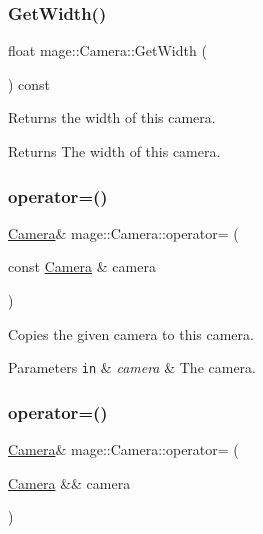 \hypertarget{classmage_1_1_camera_a2285655605035118861297b2449a3443}{}\label{classmage_1_1_camera_a2285655605035118861297b2449a3443} 
\subsubsection{\texorpdfstring{Get\+Width()}{GetWidth()}}
{\footnotesize\ttfamily float mage\+::\+Camera\+::\+Get\+Width (\begin{DoxyParamCaption}{ }\end{DoxyParamCaption}) const}

Returns the width of this camera.

\begin{DoxyReturn}{Returns}
The width of this camera. 
\end{DoxyReturn}
\hypertarget{classmage_1_1_camera_ae16a5f66b80f7fa771475aa1eb099634}{}\label{classmage_1_1_camera_ae16a5f66b80f7fa771475aa1eb099634} 
\subsubsection{\texorpdfstring{operator=()}{operator=()}\hspace{0.1cm}{\footnotesize\ttfamily [1/2]}}
{\footnotesize\ttfamily \hyperlink{classmage_1_1_camera}{Camera}\& mage\+::\+Camera\+::operator= (\begin{DoxyParamCaption}\item[{const \hyperlink{classmage_1_1_camera}{Camera} \&}]{camera }\end{DoxyParamCaption})}

Copies the given camera to this camera.


\begin{DoxyParams}[1]{Parameters}
\mbox{\tt in}  & {\em camera} & The camera. \\
\hline
\end{DoxyParams}
\hypertarget{classmage_1_1_camera_aab826877e458127dadfb7ed54f9336a9}{}\label{classmage_1_1_camera_aab826877e458127dadfb7ed54f9336a9} 
\subsubsection{\texorpdfstring{operator=()}{operator=()}\hspace{0.1cm}{\footnotesize\ttfamily [2/2]}}
{\footnotesize\ttfamily \hyperlink{classmage_1_1_camera}{Camera}\& mage\+::\+Camera\+::operator= (\begin{DoxyParamCaption}\item[{\hyperlink{classmage_1_1_camera}{Camera} \&\&}]{camera }\end{DoxyParamCaption})}


